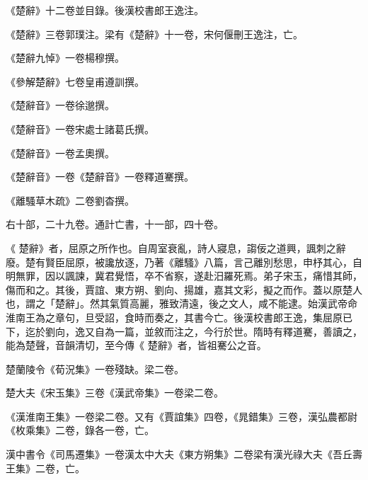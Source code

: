 
\begin{pinyinscope}

 《楚辭》十二卷並目錄。後漢校書郎王逸注。



 《楚辭》三卷郭璞注。梁有《楚辭》十一卷，宋何偃刪王逸注，亡。



 《楚辭九悼》一卷楊穆撰。



 《參解楚辭》七卷皇甫遵訓撰。



 《楚辭音》一卷徐邈撰。



 《楚辭音》一卷宋處士諸葛氏撰。



 《楚辭音》一卷孟奧撰。



 《楚辭音》一卷《楚辭音》一卷釋道騫撰。



 《離騷草木疏》二卷劉杳撰。



 右十部，二十九卷。通計亡書，十一部，四十卷。



 《
 楚辭》者，屈原之所作也。自周室衰亂，詩人寢息，謅佞之道興，諷刺之辭廢。楚有賢臣屈原，被讒放逐，乃著《離騷》八篇，言己離別愁思，申杼其心，自明無罪，因以諷諫，冀君覺悟，卒不省察，遂赴汨羅死焉。弟子宋玉，痛惜其師，傷而和之。其後，賈誼、東方朔、劉向、揚雄，嘉其文彩，擬之而作。蓋以原楚人也，謂之「楚辭」。然其氣質高麗，雅致清遠，後之文人，咸不能逮。始漢武帝命淮南王為之章句，旦受詔，食時而奏之，其書今亡。後漢校書郎王逸，集屈原已下，迄於劉向，逸又自為一篇，並敘而注之，今行於世。隋時有釋道騫，善讀之，能為楚聲，音韻清切，至今傳《
 楚辭》者，皆祖騫公之音。



 楚蘭陵令《荀況集》一卷殘缺。梁二卷。



 楚大夫《宋玉集》三卷《漢武帝集》一卷梁二卷。



 《漢淮南王集》一卷梁二卷。又有《賈誼集》四卷，《晁錯集》三卷，漢弘農都尉《枚乘集》二卷，錄各一卷，亡。



 漢中書令《司馬遷集》一卷漢太中大夫《東方朔集》二卷梁有漢光祿大夫《吾丘壽王集》二卷，亡。




\end{pinyinscope}
